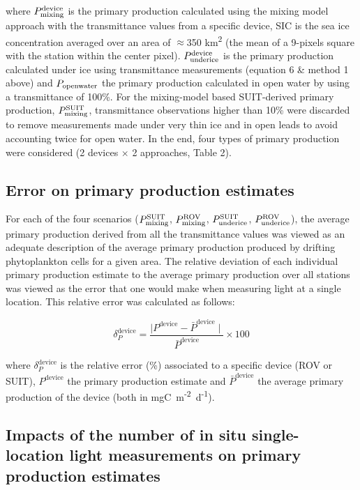 \documentclass[draft]{agujournal2018}
\newcommand{\ppundericedevice}{\ensuremath{P_{\textnormal{\scriptsize underice}}^{\textnormal{\scriptsize device}}}}
\newcommand{\ppmixingdevice}{\ensuremath{P_{\textnormal{\scriptsize mixing}}^{\textnormal{\scriptsize device}}}}
\newcommand{\ppmixingsuit}{\ensuremath{P_{\textnormal{\scriptsize mixing}}^{\textnormal{\scriptsize SUIT}}}}
\newcommand{\ppmixingrov}{\ensuremath{P_{\textnormal{\scriptsize mixing}}^{\textnormal{\scriptsize ROV}}}}
\newcommand{\ppsuitunderice}{\ensuremath{P_{\textnormal{\scriptsize underice}}^{\textnormal{\scriptsize SUIT}}}}
\newcommand{\pprovunderice}{\ensuremath{P_{\textnormal{\scriptsize underice}}^{\textnormal{\scriptsize ROV}}}}
\newcommand{\ppopenwater}{\ensuremath{P_{\textnormal{\scriptsize openwater}}}}
\newcommand{\dailypp}{mgC~m\textsuperscript{-2}~d\textsuperscript{-1}}
\begin{document}
where \ppmixingdevice{} is the primary production calculated using the mixing model approach with the transmittance values from a specific device, SIC is the sea ice concentration averaged over an area of $\approx$350 km\textsuperscript{2} (the mean of a 9-pixels square with the station within the center pixel). \ppundericedevice{} is the primary production calculated under ice using transmittance measurements (equation 6 \& method 1 above) and \ppopenwater{} the primary production calculated in open water by using a transmittance of 100\%. For the mixing-model based SUIT-derived primary production, \ppmixingsuit{}, transmittance observations higher than 10\% were discarded to remove measurements made under very thin ice and in open leads to avoid accounting twice for open water. In the end, four types of primary production were considered (2 devices $\times$ 2 approaches, Table 2).

\subsection{Error on primary production estimates}

For each of the four scenarios (\ppmixingsuit{}, \ppmixingrov{}, \ppsuitunderice{}, \pprovunderice{}), the average primary production derived from all the transmittance values was viewed as an adequate description of the average primary production produced by drifting phytoplankton cells for a given area. The relative deviation of each individual primary production estimate to the average primary production over all stations was viewed as the error that one would make when measuring light at a single location. This relative error was calculated as follows:

\begin{linenomath*}
    \begin{equation}
		\delta_P^{\text{device}} = \frac{\mid P^{\text{device}} - \bar{P}^{\text{device}} \mid}{\bar{P}^{\text{device}}} \times 100
	\end{equation}
\end{linenomath*}

where $\delta_P^{\text{device}}$ is the relative error (\%) associated to a specific device (ROV or SUIT), $P^{\text{device}}$ the primary production estimate and $\bar{P}^{\text{device}}$ the average primary production of the device (both in \dailypp{}).

\subsection{Impacts of the number of in situ single-location light  measurements on primary production estimates}
\end{document}
